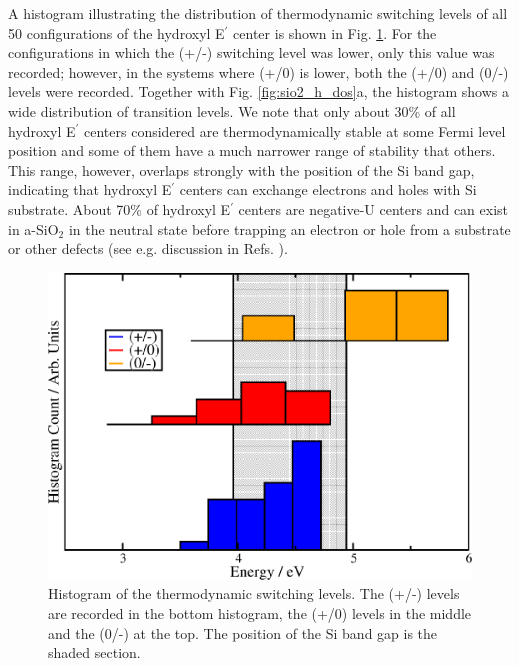 \documentclass[aps,prb,reprint,superscriptaddress,showpacs]{revtex4-1}
\begin{document}
A histogram illustrating the distribution of thermodynamic switching levels of all 50 configurations of the hydroxyl E$^\prime$ center is shown in Fig. \ref{fig:hydroxy_thermodynamic_levels}. For the configurations in which the (+/-) switching level was lower, only this value was recorded; however, in the systems where (+/0) is lower, both the (+/0) and (0/-) levels were recorded. Together with Fig. \ref{fig:sio2_h_dos}a, the histogram shows a wide distribution of transition levels. We note that only about 30\% of all hydroxyl E$^\prime$ centers considered are thermodynamically stable at some Fermi level position and some of them have a much narrower range of stability that others. This range, however, overlaps strongly with the position of the Si band gap, indicating that hydroxyl E$^\prime$ centers can exchange electrons and holes with Si substrate. About 70\% of hydroxyl E$^\prime$ centers are negative-U centers and can exist in a-SiO$_2$ in the neutral state before trapping an electron or hole from a substrate or other defects (see e.g. discussion in Refs. \cite{shkrob1,shkrob2}).  

\begin{figure}[h!]
\includegraphics{thermodynamic_levels4.png}
\caption{Histogram of the thermodynamic switching levels. The (+/-) levels are recorded in the bottom histogram, the (+/0) levels in the middle and the (0/-) at the top. The position of the Si band gap is the shaded section.}
\label{fig:hydroxy_thermodynamic_levels}
\end{figure}
\end{document}
